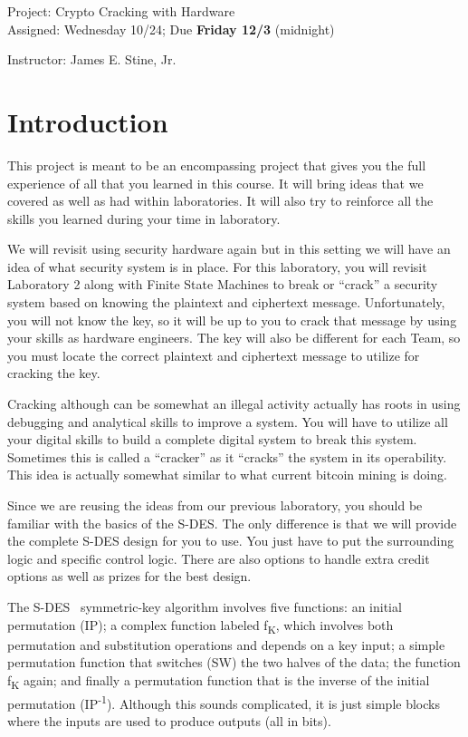 \documentclass{article}
\newcommand{\myassignment}{Project: Crypto Cracking with Hardware}
\newcommand{\myduedate}{Assigned: Wednesday 10/24; Due \textbf{Friday 12/3} (midnight)}
\newcommand{\myinstructor}{Instructor: James E. Stine, Jr.}
\begin{document}
\begin{center}
  {\huge \myassignment} \\
  {\large \myduedate} \\
  \begin{flushright}
  \myinstructor \\
  \end{flushright}
\end{center}

\section{Introduction}

This project is meant to be an encompassing project that gives you the
full experience of all that you learned in this course.  It will bring
ideas that we covered as well as had within laboratories.  It will
also try to reinforce all the skills you learned during your time in
laboratory.

We will revisit using security hardware again but in this setting we
will have an idea of what security system is in place.  For this
laboratory, you will revisit Laboratory 2 along with Finite State
Machines to break or ``crack'' a security system based on knowing the
plaintext and ciphertext message.  Unfortunately, you will not know
the key, so it will be up to you to crack that message by using your
skills as hardware engineers.  The key will also be different for each
Team, so you must locate the correct plaintext and ciphertext message
to utilize for cracking the key.

Cracking although can be somewhat an illegal activity actually has roots
in using debugging and analytical skills to improve a system.  You
will have to utilize all your digital skills to build a complete
digital system to break this system.  Sometimes this is called a
``cracker'' as it ``cracks'' the system in its operability.   This
idea is actually somewhat
similar to what current bitcoin mining is doing.

Since we are reusing the ideas from our previous laboratory, you
should be familiar with the basics of the S-DES.  The only difference is
that we will provide the complete S-DES design for you to use.  You just have
to put the surrounding logic and specific control logic.  There are
also options to handle extra credit options as well as prizes for the
best design.

The S-DES~\cite{fips463} symmetric-key algorithm involves five functions: an initial
permutation (IP); a complex function labeled f\textsubscript{K}, which involves both
permutation and substitution operations and depends on
a key input; a simple permutation function that switches (SW) the two
halves of the data; the function f\textsubscript{K} again; and finally
a permutation
function that is the inverse of the initial permutation
(IP\textsuperscript{-1}).
Although this sounds complicated, it is just simple blocks where the
inputs are used to produce outputs (all in bits).
\end{document}
